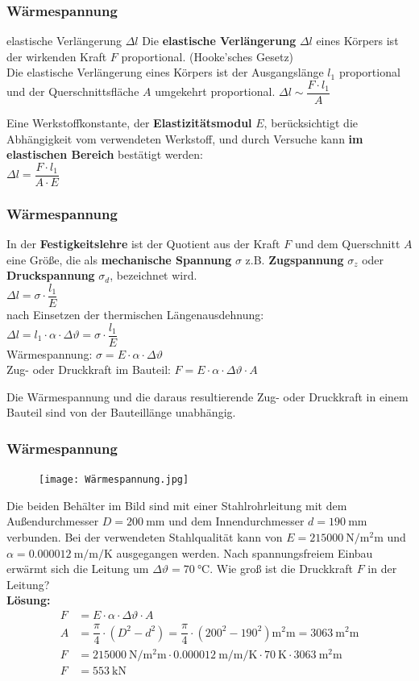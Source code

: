 \documentclass{beamer}
\begin{document}
\frame
{
\frametitle{Wärmespannung}
	\begin{block}{elastische Verlängerung $\Delta l$}
	Die \textbf{elastische Verlängerung} $\Delta l$ eines Körpers ist der wirkenden Kraft $F$ proportional. (Hooke'sches Gesetz)\\
	Die elastische Verlängerung eines Körpers ist der Ausgangslänge $l_1$ proportional und der Querschnittsfläche $A$ umgekehrt proportional.
	$\Delta l\sim\dfrac{F\cdot l_1}{A}$
	\end{block}
	Eine Werkstoffkonstante, der \textbf{Elastizitätsmodul} $E$, berücksichtigt die Abhängigkeit vom verwendeten Werkstoff, und durch Versuche kann \textbf{im elastischen Bereich} bestätigt werden:\\
	$\Delta l=\dfrac{F\cdot l_1}{A\cdot E}$
}	
\frame
{
\frametitle{Wärmespannung}
	In der \textbf{Festigkeitslehre} ist der Quotient aus der Kraft $F$ und dem Querschnitt $A$ eine Größe, die als \textbf{mechanische Spannung} $\sigma$ z.B. \textbf{Zugspannung} $\sigma_z$ oder \textbf{Druckspannung} $\sigma_d$, bezeichnet wird.\\
	$\Delta l=\sigma\cdot\dfrac{l_1}{E}$\\
	nach Einsetzen der thermischen Längenausdehnung:\\
	$\Delta l=l_1\cdot\alpha\cdot\Delta\vartheta=\sigma\cdot\dfrac{l_1}{E}$\\
	Wärmespannung: $\sigma=E\cdot\alpha\cdot\Delta\vartheta$\\
	Zug- oder Druckkraft im Bauteil: $F=E\cdot\alpha\cdot\Delta\vartheta\cdot A$\\
	\begin{block}{}
	Die Wärmespannung und die daraus resultierende Zug- oder Druckkraft in einem Bauteil sind von der Bauteillänge unabhängig.
	\end{block}
}

\frame
{
\frametitle{Wärmespannung}
\begin{figure}
	\texttt{[image: Wärmespannung.jpg]}
\end{figure}
Die beiden Behälter im Bild sind mit einer Stahlrohrleitung mit dem Außendurchmesser $D=\SI{200}{\milli\meter}$ und dem Innendurchmesser $d=\SI{190}{\milli\meter}$ verbunden. Bei der verwendeten Stahlqualität kann von $E=\SI{215000}{\newton\per\square\milli\meter} $ und $\alpha=\SI{0.000012}{\meter\per\meter\per\kelvin}$ ausgegangen werden. Nach spannungsfreiem Einbau erwärmt sich die Leitung um $\Delta\vartheta=\SI{70}{\celsius}$. Wie groß ist die Druckkraft $F$ in der Leitung?\\
\textbf{Lösung:}
\begin{align*}
F&=E\cdot\alpha\cdot\Delta\vartheta\cdot A\\
A&=\dfrac{\pi}{4}\cdot(D^{2}-d^{2})=\dfrac{\pi}{4}\cdot(200^{2}-190^{2})\si{\square\milli\meter}=\SI{3063}{\square\milli\meter}\\
F&=\SI{215000}{\newton\per\square\milli\meter}\cdot\SI{0.000012}{\meter\per\meter\per\kelvin}\cdot\SI{70}{\kelvin}\cdot\SI{3063}{\square\milli\meter}\\
F&=\SI{553}{\kilo\newton}
\end{align*}
}
\end{document}

